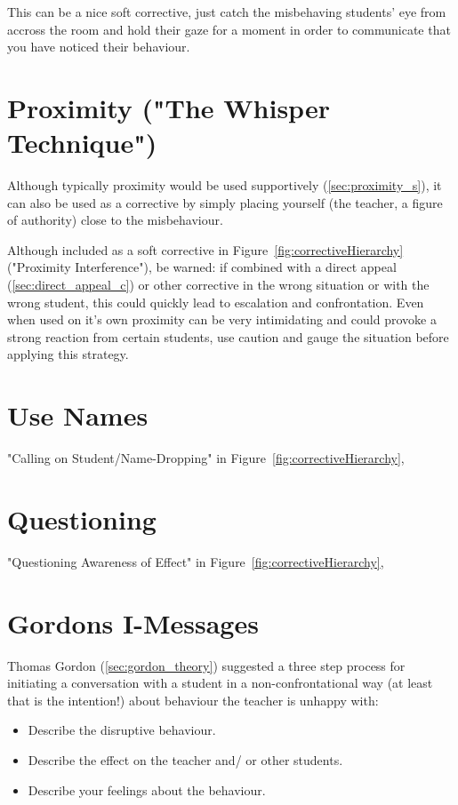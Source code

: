 \documentclass[12pt]{report}
\begin{document}
This can be a nice soft corrective, just catch the misbehaving students' eye from accross the room and hold their gaze for a moment in order to communicate that you have noticed their behaviour\footnotemark. 



\section{Proximity ("The Whisper Technique")}
\label{sec:proximity_c}

Although typically proximity would be used supportively (\ref{sec:proximity_s}), it can also be used as a corrective by simply placing yourself (the teacher, a figure of authority) close to the misbehaviour\footnotemark[\value{footnote}].

Although included as a soft corrective in Figure~\ref{fig:correctiveHierarchy} ("Proximity Interference"), be warned: if combined with a direct appeal (\ref{sec:direct_appeal_c}) or other corrective in the wrong situation or with the wrong student, this could quickly lead to escalation and confrontation. Even when used on it's own proximity can be very intimidating and could provoke a strong reaction from certain students, use caution and gauge the situation before applying this strategy.



\section{Use Names}
\label{sec:use_names_c}

"Calling on Student/Name-Dropping" in Figure~\ref{fig:correctiveHierarchy}, 

\footnotemark[\value{footnote}]

\section{Questioning}
\label{sec:questioning_c}

"Questioning Awareness of Effect" in Figure~\ref{fig:correctiveHierarchy}, 



\section{Gordons I-Messages}
\label{sec:i_messages_c}

Thomas Gordon (\ref{sec:gordon_theory}) suggested a three step process for initiating a conversation with a student in a non-confrontational way (at least that is the intention!)  about behaviour the teacher is unhappy with:
\begin{itemize}
  \item Describe the disruptive behaviour.
  \item Describe the effect on the teacher and/ or other students.
  \item Describe your feelings about the behaviour.
\end{itemize}
\end{document}
